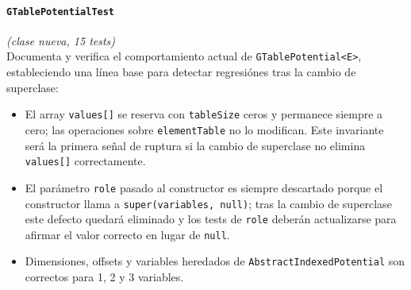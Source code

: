 \documentclass[11pt,a4paper]{article}
\newcommand{\code}[1]{\texttt{#1}}
\begin{document}
\paragraph{\code{GTablePotentialTest}} \emph{(clase nueva, 15 tests)}\\
Documenta y verifica el comportamiento actual de \code{GTablePotential<E>},
estableciendo una línea base para detectar regresiónes tras la
cambio de superclase:
\begin{itemize}
  \item El array \code{values[]} se reserva con \code{tableSize} ceros y permanece
        siempre a cero; las operaciones sobre \code{elementTable} no lo modifican.
        Este invariante será la primera señal de ruptura si la cambio de superclase
        no elim\-ina \code{values[]} correctamente.
  \item El parámetro \code{role} pasado al constructor es siempre descartado
        porque el constructor llama a \code{super(variables,\,null)}; tras la
        cambio de superclase este defecto quedará eliminado y los tests de \code{role}
        deberán actualizarse para afirmar el valor correcto en lugar de
        \code{null}.
  \item Dimensiones, offsets y variables heredados de \code{AbstractIndexedPotential}
        son correctos para 1, 2 y 3 variables.
\end{itemize}
\end{document}
